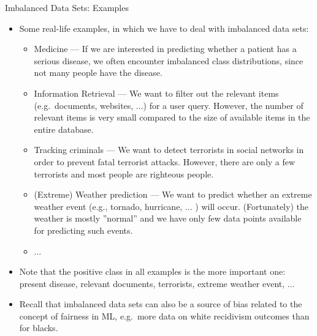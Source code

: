 \documentclass[11pt,compress,t,notes=noshow, xcolor=table]{beamer}
\begin{document}
\begin{vbframe}{Imbalanced Data Sets: Examples}
%	
\footnotesize{
	\begin{itemize}
%		
		\item Some real-life examples, in which we have to deal with imbalanced data sets:
%		
		\begin{itemize}
			\scriptsize
			\item Medicine --- If we are interested in predicting whether a patient has a serious disease, we often encounter imbalanced class distributions, since not many people have the disease.
%			
			\item Information Retrieval --- We want to filter out the relevant items (e.g.\ documents, websites, $\ldots$) for a user query. However, the number of relevant items is very small compared to the size of available items in the entire database.  
%			
			\item Tracking criminals --- We want to detect terrorists in social networks in order to prevent fatal terrorist attacks. However, there are only a few terrorists and most people are righteous people. 
%			
			\item (Extreme) Weather prediction ---  We want to predict whether an extreme weather event (e.g., tornado, hurricane, $\ldots$ ) will occur. (Fortunately) the weather is mostly ''normal'' and we have only few data points available for predicting such events.
%			
			\item $\ldots$
		\end{itemize}
%	 
	\item Note that the positive class in all examples is the more important one: present disease, relevant documents, terrorists, extreme weather event, $\ldots$
%
	\item Recall that imbalanced data sets can also be a source of bias related to the concept of fairness in ML, e.g.\ more data on white recidivism outcomes than for blacks.
%
	\end{itemize}}
%
\end{vbframe}
\end{document}
